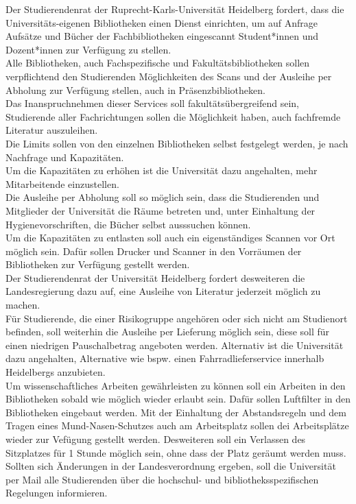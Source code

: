     {
        Der Studierendenrat der Ruprecht-Karls-Universität Heidelberg fordert, dass die
        Universitäts-eigenen Bibliotheken einen Dienst einrichten, um auf Anfrage Aufsätze
        und
        Bücher der Fachbibliotheken eingescannt Student*innen und Dozent*innen zur
        Verfügung zu stellen. \\ Alle Bibliotheken, auch Fachspezifische und Fakultätsbibliotheken sollen verpflichtend den Studierenden Möglichkeiten des Scans und der Ausleihe per Abholung zur Verfügung stellen, auch in Präsenzbibliotheken.\\
            Das Inanspruchnehmen dieser Services soll fakultätsübergreifend sein, Studierende aller Fachrichtungen sollen die Möglichkeit haben, auch fachfremde Literatur auszuleihen.\\
            Die Limits sollen von den einzelnen Bibliotheken selbst festgelegt werden, je nach Nachfrage und Kapazitäten.\\
            Um die Kapazitäten zu erhöhen ist die Universität dazu angehalten, mehr Mitarbeitende einzustellen.\\
            Die Ausleihe per Abholung soll so möglich sein, dass die Studierenden und Mitglieder der Universität die Räume betreten und, unter Einhaltung der Hygienevorschriften, die Bücher selbst ausssuchen können.\\
            Um die Kapazitäten zu entlasten soll auch ein eigenständiges Scannen vor Ort möglich sein. Dafür sollen Drucker und Scanner in den Vorräumen der Bibliotheken zur Verfügung gestellt werden.\\
            Der Studierendenrat der Universität Heidelberg fordert desweiteren die Landesregierung dazu auf, eine Ausleihe von Literatur jederzeit möglich zu machen.\\
            Für Studierende, die einer Risikogruppe angehören oder sich nicht am Studienort befinden, soll weiterhin die Ausleihe per Lieferung möglich sein, diese soll für einen niedrigen Pauschalbetrag angeboten werden. Alternativ ist die Universität dazu angehalten, Alternative wie bspw. einen Fahrradlieferservice innerhalb Heidelbergs anzubieten.\\
            Um wissenschaftliches Arbeiten gewährleisten zu können soll ein Arbeiten in den Bibliotheken sobald wie möglich wieder erlaubt sein. Dafür sollen Luftfilter in den Bibliotheken eingebaut werden. Mit der Einhaltung der Abstandsregeln und dem Tragen eines Mund-Nasen-Schutzes auch am Arbeitsplatz sollen dei Arbeitsplätze wieder zur Vefügung gestellt werden. Desweiteren soll ein Verlassen des Sitzplatzes für 1 Stunde möglich sein, ohne dass der Platz geräumt werden muss.\\
            Sollten sich Änderungen in der Landesverordnung ergeben, soll die Universität per Mail alle Studierenden über die hochschul- und bibliotheksspezifischen Regelungen informieren.
        
}
